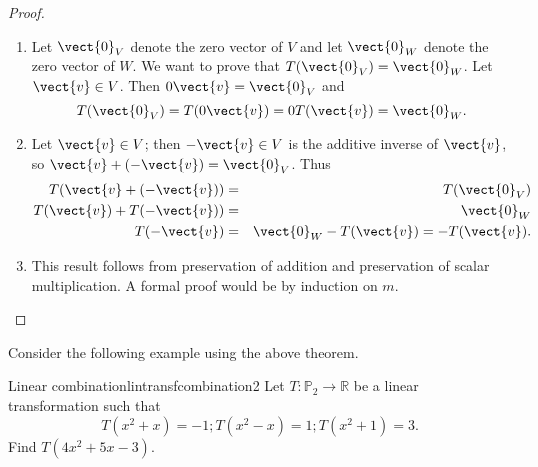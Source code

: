 \begin{proof}
\begin{enumerate}
\item Let $\vect{0}_V$ denote the zero vector of $V$ and let
$\vect{0}_W$ denote the zero vector of $W$.
We want to prove that $T(\vect{0}_V)=\vect{0}_W$.
Let $\vect{v}\in V$. 
Then $0\vect{v}=\vect{0}_V$ and
\[ T(\vect{0}_V)=T(0\vect{v})=0T(\vect{v})=\vect{0}_W.\]
\item
Let $\vect{v}\in V$; then $-\vect{v}\in V$ is the additive
inverse of $\vect{v}$, so $\vect{v} + (-\vect{v})=\vect{0}_V$.
Thus
\begin{eqnarray*}
T(\vect{v} + (-\vect{v})) & = & T(\vect{0}_V) \\
T(\vect{v}) + T(-\vect{v})) & = & \vect{0}_W \\
T(-\vect{v}) & = & \vect{0}_W - T(\vect{v}) =  - T(\vect{v}).
\end{eqnarray*}
\item This result follows from 
preservation of addition and preservation of scalar multiplication.
A formal proof would be by induction on $m$.
\end{enumerate}
\end{proof}

Consider the following example using the above theorem. 

\begin{example}{Linear combination}{lintransfcombination2}
Let $T:\mathbb{P}_2 \to \mathbb{R}$ be a linear transformation such that
\[ T(x^2+x)=-1; T(x^2-x)=1; T(x^2+1)=3.\]
Find $T(4x^2+5x-3)$.
\end{example}

